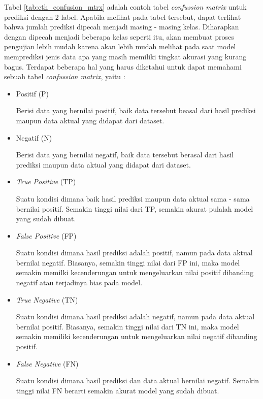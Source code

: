 Tabel \ref{tab:cth_confusion_mtrx} adalah contoh tabel \textit{confussion matrix} untuk prediksi dengan 2 label. Apabila melihat pada tabel tersebut, dapat terlihat bahwa jumlah prediksi dipecah menjadi masing - masing kelas. Diharapkan dengan dipecah menjadi beberapa kelas seperti itu, akan membuat proses pengujian lebih mudah karena akan lebih mudah melihat pada saat model memprediksi jenis data apa yang masih memiliki tingkat akurasi yang kurang bagus. Terdapat beberapa hal yang harus diketahui untuk dapat memahami sebuah tabel \textit{confussion matrix}, yaitu :

\begin{itemize}[nolistsep]
    \item Positif (P)

          Berisi data yang bernilai positif, baik data tersebut beasal dari hasil prediksi maupun data aktual yang didapat dari dataset.

    \item Negatif (N)

          Berisi data yang bernilai negatif, baik data tersebut berasal dari hasil prediksi maupun data aktual yang didapat dari dataset.

    \item \textit{True Positive} (TP)

          Suatu kondisi dimana baik hasil prediksi maupun data aktual sama - sama bernilai positif. Semakin tinggi nilai dari TP, semakin akurat pulalah model yang sudah dibuat.

    \item \textit{False Positive} (FP)

          Suatu kondisi dimana hasil prediksi adalah positif, namun pada data aktual bernilai negatif. Biasanya, semakin tinggi nilai dari FP ini, maka model semakin memilki kecenderungan untuk mengeluarkan nilai positif dibanding negatif atau terjadinya bias pada model.

    \item \textit{True Negative} (TN)

          Suatu kondisi dimana hasil prediksi adalah negatif, namun pada data aktual bernilai positif. Biasanya, semakin tinggi nilai dari TN ini, maka model semakin memiliki kecenderungan untuk mengeluarkan nilai negatif dibanding positif.

    \item \textit{False Negative} (FN)

          Suatu kondisi dimana hasil prediksi dan data aktual bernilai negatif. Semakin tinggi nilai FN berarti semakin akurat model yang sudah dibuat.

\end{itemize}
